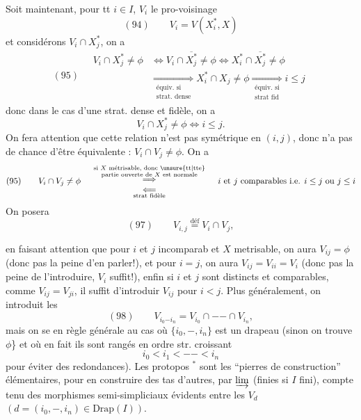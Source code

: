 Soit maintenant, pour tt $i\in I$, $V_i$ le pro-voisinage
\[(94)\qquad V_i=V(X_i^*,X)\]
et considérons $V_i\cap X_j^*$, on a
\[
(95)\quad\begin{aligned}
V_i\cap X_j^*\neq\phi&\Longleftrightarrow V_i\cap\overline{X_j^*}\neq\phi\Longleftrightarrow X_i^*\cap\overline{X_j^*}\neq\phi\\
&\underset{\substack{\text{équiv. si}\\\text{strat. dense}}}{\Longrightarrow}X_i^*\cap X_j\neq\phi\underset{\substack{\text{équiv. si}\\\text{strat fid}}}{\Longrightarrow}i\leq j
\end{aligned}
\]
donc dans le cas d'une strat. dense et fidèle,  on a
\[V_i\cap X_j^*\neq\phi\Longleftrightarrow i\leq j.\]
On fera attention que cette relation n'est pas symétrique en $(i,j)$,  donc n'a pas de chance d'être équivalente : $V_i\cap V_j\neq\phi$. On a
\[
(95)\qquad V_i\cap V_j\neq\phi\quad
\begin{array}{c}
\overset{\substack{\text{si $X$ métrisable, donc \unsure{tt|tte}}\\\text{partie ouverte de $X$ est normale}}}{\Longrightarrow}\\
\underset{\text{strat fidèle}}{\Longleftarrow}
\end{array}
\quad\text{$i$ et $j$ comparables i.e. $i\leq j$ ou $j\leq i$}
\]
On posera
\[(97)\qquad V_{i,j}\overset{\mathrm{déf}}=V_i\cap V_j,\]


en faisant attention que pour $i$ et $j$ incomparab et $X$ metrisable, on  aura $V_{ij}=\phi$  (donc pas la peine d'en parler!), et pour $i=j$, on aura $V_{ij}=V_{ii}=V_i$ (donc pas la peine de l'introduire, $V_i$ suffit!), enfin  si $i$ et $j$ sont distincts et comparables,  comme $V_{ij}=V_{ji}$, il suffit d'introduir $V_{ij}$ pour  $i<j$. Plus généralement, on introduit les
\[(98)\qquad V_{i_0\mathord{-}i_n}=V_{i_0}\cap\mathord{-}\mathord{-}\cap V_{i_n},\]
mais on se  en règle générale au cas où $\{i_0,\mathord{-},i_n\}$ est un drapeau (sinon on trouve $\phi$\} et où en fait ils sont rangés en ordre str. croissant
\[i_0<i_1<\mathord{-}\mathord{-}<i_n\]
\unsure{(}pour éviter des redondances). Les protopos $^*$ sont les ``pierres de construction'' élémentaires, pour en construire des tas d'autres, par $\varinjlim$ (finies si $I$ fini), compte tenu des morphismes semi-simpliciaux évidents entre les $V_d$ $(d=(i_0,\mathord{-},i_n)\in\mathrm{Drap}(I))$.

